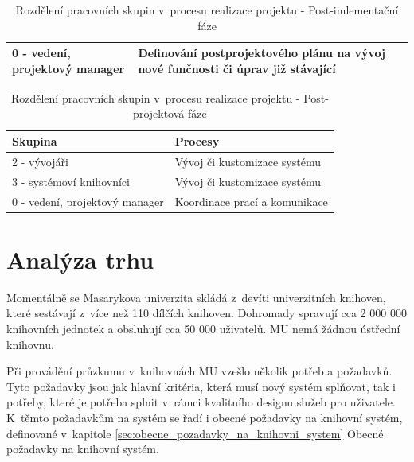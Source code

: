\documentclass[
	11pt, oneside, printed, final, palatino, monochrome
	microtype,
	table,   %
	lof,     %
	lot     %
]{fithesis3}
\newcommand{\bold}[1]{\textbf{#1}}
\begin{document}
{\begin{table}[H]
\begin{tabular}{| p{3cm} | p{8.3cm} |}
	0 - vedení, projektový manager
    & 
    Definování postprojektového plánu na vývoj nové funčnosti či úprav již stávající
    \\ \hline
    
    \end{tabular}
    \caption{Rozdělení pracovních skupin v~procesu realizace projektu - Post-imlementační fáze}
\end{table}

\begin{table}[H]
    \centering
    \begin{tabular}{| p{3cm} | p{8.3cm} |}
    \hline
    \bold{Skupina} 	
    & 
    \bold{Procesy} 
    \\ \hline
    
	2 - vývojáři
    & 
	Vývoj či kustomizace systému
    \\ \hline
    
	3 - systémoví knihovníci
    & 
    Vývoj či kustomizace systému
    \\ \hline
    
	0 - vedení, projektový manager
    & 
    Koordinace prací a komunikace
    \\ \hline
    
    \end{tabular}
    \caption{Rozdělení pracovních skupin v~procesu realizace projektu - Post-projektová fáze}
\end{table}

\section{Analýza trhu}
Momentálně se Masarykova univerzita skládá z~devíti univerzitních knihoven, které sestávají z~více než 110 dílčích knihoven. Dohromady spravují cca 2 000 000 knihovních jednotek a obsluhují cca 50 000 uživatelů. MU nemá žádnou ústřední knihovnu.

Při provádění průzkumu v~knihovnách MU vzešlo několik potřeb a požadavků. Tyto požadavky jsou jak hlavní kritéria, která musí nový systém splňovat, tak i potřeby, které je potřeba splnit v~rámci kvalitního designu služeb pro uživatele. K~těmto požadavkům na systém se řadí i obecné požadavky na knihovní systém, definované v~kapitole \ref{sec:obecne_pozadavky_na_knihovni_system} Obecné požadavky na knihovní systém.

}
\end{document}
